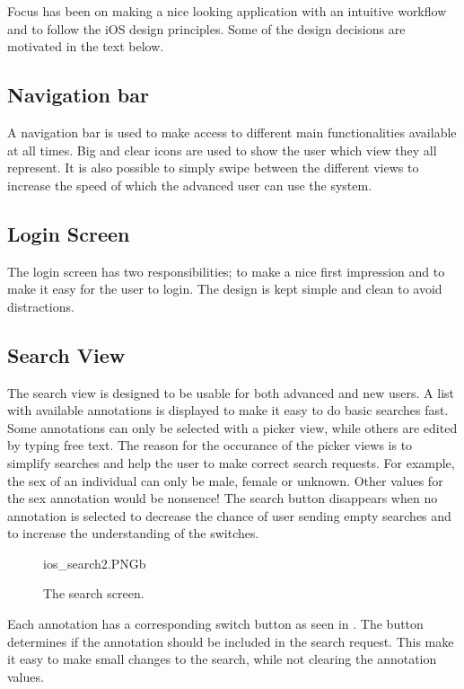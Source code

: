 Focus has been on making a nice looking application with an intuitive workflow and to follow the iOS design principles. Some of the design decisions are motivated in the text below.

\subsection{Navigation bar}
A navigation bar is used to make access to different main functionalities available at all times. Big and clear icons are used to show the user which view they all represent. It is also possible to simply swipe between the different views to increase the speed of which the advanced user can use the system.

\subsection{Login Screen}
The login screen has two responsibilities; to make a nice first impression and to make it easy for the user to login. The design is kept simple and clean to avoid distractions.

\subsection{Search View}
The search view is designed to be usable for both advanced and new users. A list with available annotations is displayed to make it easy to do basic searches fast. Some annotations can only be selected with a picker view, while others are edited by typing free text. The reason for the occurance of the picker views is to simplify searches and help the user to make correct search requests. For example, the sex of an individual can only be male, female or unknown. Other values for the sex annotation would be nonsence! The search button disappears when no annotation is selected to decrease the chance of user sending empty searches and to increase the understanding of the switches. 

\begin{figure}[ht]
		{ios_search2.PNG}{b}
\caption{The search screen.}
\label{fig:ios_search2}
\end{figure}
\FloatBarrier

Each annotation has a corresponding switch button as seen in . The button determines if the annotation should be included in the search request. This make it easy to make small changes to the search, while not clearing the annotation values.

